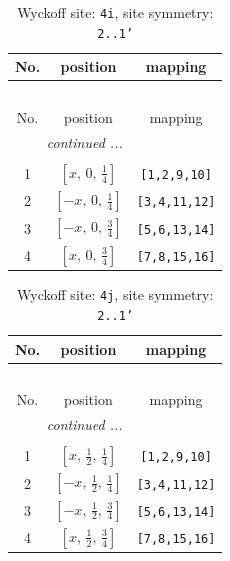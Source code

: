 \documentclass[fleqn,8pt]{jsarticle}
\begin{document}
\begin{longtable}{ccc}
\caption{Wyckoff site: {\tt 4i}, site symmetry: {\tt 2..1'}}
 \\
 \hline \hline
No. & position & mapping \\ \hline \endfirsthead

\multicolumn{2}{l}{\tablename\ \thetable{}} \\
 \hline \hline
No. & position & mapping \\ \hline \endhead

 \hline \hline
\multicolumn{2}{r}{\footnotesize\it continued ...} \\ \endfoot

 \hline \hline
\multicolumn{2}{r}{} \\ \endlastfoot

1 & $\left[ x,\, 0,\, \frac{1}{4} \right]$ & {\tt [1,2,9,10]} \\ \hline
2 & $\left[ - x,\, 0,\, \frac{1}{4} \right]$ & {\tt [3,4,11,12]} \\ \hline
3 & $\left[ - x,\, 0,\, \frac{3}{4} \right]$ & {\tt [5,6,13,14]} \\ \hline
4 & $\left[ x,\, 0,\, \frac{3}{4} \right]$ & {\tt [7,8,15,16]} \\
\end{longtable}
\renewcommand{\arraystretch}{1.2}
\begin{longtable}{ccc}
\caption{Wyckoff site: {\tt 4j}, site symmetry: {\tt 2..1'}}
 \\
 \hline \hline
No. & position & mapping \\ \hline \endfirsthead

\multicolumn{2}{l}{\tablename\ \thetable{}} \\
 \hline \hline
No. & position & mapping \\ \hline \endhead

 \hline \hline
\multicolumn{2}{r}{\footnotesize\it continued ...} \\ \endfoot

 \hline \hline
\multicolumn{2}{r}{} \\ \endlastfoot

1 & $\left[ x,\, \frac{1}{2},\, \frac{1}{4} \right]$ & {\tt [1,2,9,10]} \\ \hline
2 & $\left[ - x,\, \frac{1}{2},\, \frac{1}{4} \right]$ & {\tt [3,4,11,12]} \\ \hline
3 & $\left[ - x,\, \frac{1}{2},\, \frac{3}{4} \right]$ & {\tt [5,6,13,14]} \\ \hline
4 & $\left[ x,\, \frac{1}{2},\, \frac{3}{4} \right]$ & {\tt [7,8,15,16]} \\
\end{longtable}
\end{document}
